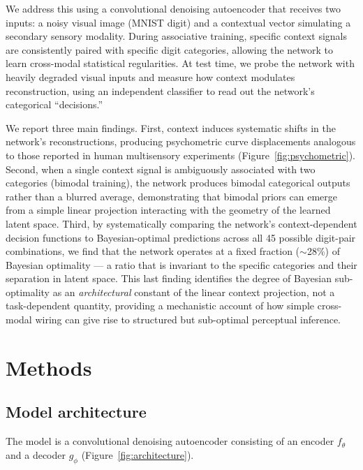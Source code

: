 \documentclass[11pt,a4paper]{article}
\begin{document}
We address this using a convolutional denoising autoencoder that receives two inputs: a noisy visual image (MNIST digit) and a contextual vector simulating a secondary sensory modality.
During associative training, specific context signals are consistently paired with specific digit categories, allowing the network to learn cross-modal statistical regularities.
At test time, we probe the network with heavily degraded visual inputs and measure how context modulates reconstruction, using an independent classifier to read out the network's categorical ``decisions.''

We report three main findings.
First, context induces systematic shifts in the network's reconstructions, producing psychometric curve displacements analogous to those reported in human multisensory experiments (Figure~\ref{fig:psychometric}).
Second, when a single context signal is ambiguously associated with two categories (bimodal training), the network produces bimodal categorical outputs rather than a blurred average, demonstrating that bimodal priors can emerge from a simple linear projection interacting with the geometry of the learned latent space.
Third, by systematically comparing the network's context-dependent decision functions to Bayesian-optimal predictions across all 45 possible digit-pair combinations, we find that the network operates at a fixed fraction ($\sim$28\%) of Bayesian optimality --- a ratio that is invariant to the specific categories and their separation in latent space.
This last finding identifies the degree of Bayesian sub-optimality as an \emph{architectural} constant of the linear context projection, not a task-dependent quantity, providing a mechanistic account of how simple cross-modal wiring can give rise to structured but sub-optimal perceptual inference.


\section{Methods}

\subsection{Model architecture}

The model is a convolutional denoising autoencoder consisting of an encoder $f_\theta$ and a decoder $g_\phi$ (Figure~\ref{fig:architecture}).
\end{document}

